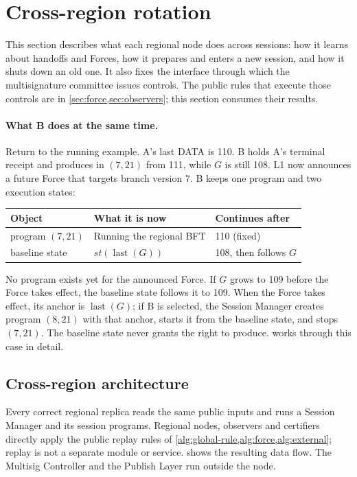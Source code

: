 \documentclass[11pt,a4paper]{article}
\newcounter{protocol}
\begin{document}
\section{Cross-region rotation}
\label{sec:xprotocols}
This section describes what each regional node does across sessions:
how it learns about handoffs and Forces, how it prepares and enters a new
session, and how it shuts down an old one. It also fixes the interface
through which the multisignature committee issues controls. The public
rules that execute those controls are in \cref{sec:force,sec:observers};
this section consumes their results.

\paragraph{What B does at the same time.}
Return to the running example. A's last DATA is 110. B holds A's
terminal receipt and produces in $(7,21)$ from 111, while $G$ is still
108. L1 now announces a future Force that targets branch version 7. B
keeps one program and two execution states:
\begin{center}\small
\begin{tabular}{@{}lll@{}}\toprule
Object & What it is now & Continues after\\\midrule
program $(7,21)$ & Running the regional BFT & 110 (fixed)\\
baseline state & $\mathit{st}(\operatorname{last}(G))$ & 108, then follows $G$\\\bottomrule
\end{tabular}
\end{center}
No program exists yet for the announced Force. If $G$ grows to 109
before the Force takes effect, the baseline state follows it to 109.
When the Force takes effect, its anchor is $\operatorname{last}(G)$; if
B is selected, the Session Manager creates program $(8,21)$ with that
anchor, starts it from the baseline state, and stops $(7,21)$. The
baseline state never grants the right to produce.
 works through this case in detail.

\subsection{Cross-region architecture}
\label{sec:runtime-modules}
Every correct regional replica reads the same public inputs and runs a
Session Manager and its session programs.  Regional nodes, observers
and certifiers directly apply the public replay rules of
\cref{alg:global-rule,alg:force,alg:external}; replay is not a separate
module or service.   shows the resulting data
flow. The Multisig Controller and the Publish Layer run outside the
node.
\end{document}
